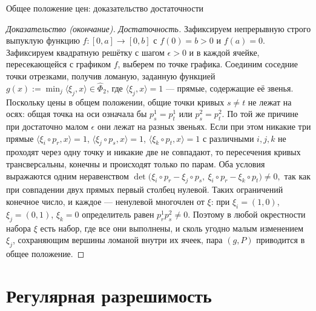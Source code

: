 \documentclass[10pt,aspectratio=169]{beamer}
\theoremstyle{plain}
\theoremstyle{definition}
\newcommand{\ip}[2]{\langle #1, #2\rangle}
\begin{document}
\begin{frame}{Общее положение цен: доказательство достаточности}
    \begin{proof}[Доказательство (окончание)]
        \emph{Достаточность.} Зафиксируем непрерывную строго выпуклую функцию $f\colon[0,a]\to[0,b]$ с $f(0)=b>0$ и $f(a)=0$. Зафиксируем квадратную решётку с шагом $\epsilon>0$ и в каждой ячейке, пересекающейся с графиком $f$, выберем по точке графика. Соединим соседние точки отрезками, получив ломаную, заданную функцией $g(x):=\min_j\ip{\xi_j}{x}\in\hat\Phi_2$, где $\ip{\xi_j}{x}=1$ --- прямые, содержащие её звенья. Поскольку цены в общем положении, общие точки кривых $s\ne t$ не лежат на осях: общая точка на оси означала бы $p^1_s=p^1_t$ или $p^2_s=p^2_t$. По той же причине при достаточно малом $\epsilon$ они лежат на разных звеньях. Если при этом никакие три прямые $\ip{\xi_i\circ p_r}{x}=1$, $\ip{\xi_j\circ p_s}{x}=1$, $\ip{\xi_k\circ p_t}{x}=1$ с различными $i,j,k$ не проходят через одну точку и никакие две не совпадают, то пересечения кривых трансверсальны, конечны и происходят только по парам. Оба условия выражаются одним неравенством $\det\bigl(\xi_i\circ p_r-\xi_j\circ p_s,\ \xi_i\circ p_r-\xi_k\circ p_t\bigr)\neq0,$
        так как при совпадении двух прямых первый столбец нулевой. Таких ограничений конечное число, и каждое --- ненулевой многочлен от $\xi$: при $\xi_i=(1,0)$, $\xi_j=(0,1)$, $\xi_k=0$ определитель равен $p^1_rp^2_s\neq0$. Поэтому в любой окрестности набора $\xi$ есть набор, где все они выполнены, и сколь угодно малым изменением $\xi_j$, сохраняющим вершины ломаной внутри их ячеек, пара $(g,P)$ приводится в общее положение.
    \end{proof}
\end{frame}

\section{Регулярная разрешимость}
\end{document}
